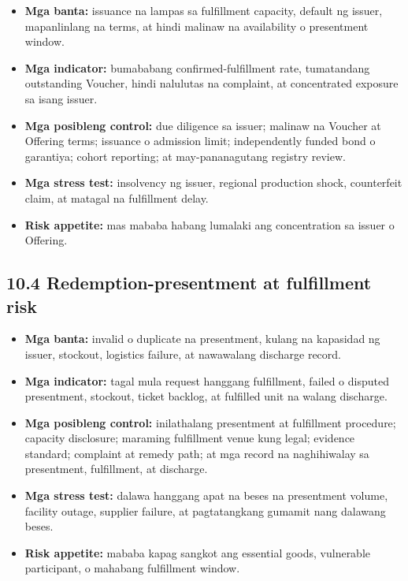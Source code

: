 \documentclass[11pt]{article}
\begin{document}
\begin{itemize}[leftmargin=*]
\item \textbf{Mga banta:} issuance na lampas sa fulfillment capacity, default ng issuer, mapanlinlang na terms, at hindi malinaw na availability o presentment window.
\item \textbf{Mga indicator:} bumababang confirmed-fulfillment rate, tumatandang outstanding Voucher, hindi nalulutas na complaint, at concentrated exposure sa isang issuer.
\item \textbf{Mga posibleng control:} due diligence sa issuer; malinaw na Voucher at Offering terms; issuance o admission limit; independently funded bond o garantiya; cohort reporting; at may-pananagutang registry review.
\item \textbf{Mga stress test:} insolvency ng issuer, regional production shock, counterfeit claim, at matagal na fulfillment delay.
\item \textbf{Risk appetite:} mas mababa habang lumalaki ang concentration sa issuer o Offering.
\end{itemize}
\subsection*{10.4 Redemption-presentment at fulfillment risk}

\begin{itemize}[leftmargin=*]
\item \textbf{Mga banta:} invalid o duplicate na presentment, kulang na kapasidad ng issuer, stockout, logistics failure, at nawawalang discharge record.
\item \textbf{Mga indicator:} tagal mula request hanggang fulfillment, failed o disputed presentment, stockout, ticket backlog, at fulfilled unit na walang discharge.
\item \textbf{Mga posibleng control:} inilathalang presentment at fulfillment procedure; capacity disclosure; maraming fulfillment venue kung legal; evidence standard; complaint at remedy path; at mga record na naghihiwalay sa presentment, fulfillment, at discharge.
\item \textbf{Mga stress test:} dalawa hanggang apat na beses na presentment volume, facility outage, supplier failure, at pagtatangkang gumamit nang dalawang beses.
\item \textbf{Risk appetite:} mababa kapag sangkot ang essential goods, vulnerable participant, o mahabang fulfillment window.
\end{itemize}
\end{document}
